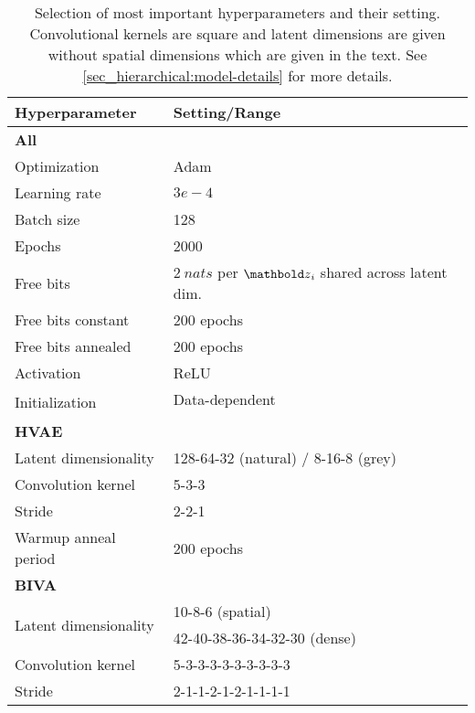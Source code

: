 {\begin{table}[t]
    \caption[Selection of most important hyperparameters]{Selection of most important hyperparameters and their setting. Convolutional kernels are square and latent dimensions are given without spatial dimensions which are given in the text. See \cref{sec_hierarchical:model-details} for more details.}
    \centering
    \begin{tabular}{ll}
        \toprule
        Hyperparameter & Setting/Range \\
        \midrule
        \multicolumn{2}{l}{\textbf{All}} \\
        \midrule
        Optimization & Adam \parencite{kingma_adam_2015} \\
        Learning rate & $3e-4$ \\
        Batch size & 128 \\
        Epochs & 2000 \\
        Free bits & $\SI{2}{nats}$ per $\zb_i$ shared across latent dim. \\
        Free bits constant & 200 epochs \\
        Free bits annealed & 200 epochs \\
        Activation & ReLU \\
        \multirow{2}{*}{Initialization} & Data-dependent \\
        & \parencite{salimans_weight_2016} \\
        \midrule
        \multicolumn{2}{l}{\textbf{HVAE}} \\
        Latent dimensionality & 128-64-32 (natural) / 8-16-8 (grey) \\
        Convolution kernel & 5-3-3 \\
        Stride & 2-2-1 \\
        Warmup anneal period & 200 epochs \\
        \midrule
        \multicolumn{2}{l}{\textbf{BIVA}} \\
        \multirow{2}{*}{Latent dimensionality} & 10-8-6 (spatial) \\
        & 42-40-38-36-34-32-30 (dense) \\
        Convolution kernel & 5-3-3-3-3-3-3-3-3-3 \\
        Stride & {2-1-1-2-1-2-1-1-1-1} \\
        \bottomrule
    \end{tabular}
    \label{tab_hierarchical:hyperparameters}
\end{table}


}
